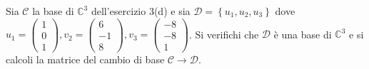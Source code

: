 \documentclass[a4paper]{article}
\begin{document}
	Sia $\mathscr{C}$ la base di $\mathbb{C}^{3}$ dell'esercizio 3(d) e sia $\mathscr{D} = \left\{u_{1}, u_{2}, u_{3}\right\}$ dove $u_{1} = \begin{pmatrix}
		1 \\ 0 \\ 1
	\end{pmatrix}, v_{2} = \begin{pmatrix}
		6 \\ -1 \\ 8
	\end{pmatrix}, v_{3} = \begin{pmatrix}
		-8 \\ -8 \\ 1
	\end{pmatrix}$. Si verifichi che $\mathscr{D}$ è una base di $\mathbb{C}^{3}$ e si calcoli la matrice del cambio di base $\mathscr{C} \rightarrow \mathscr{D}$.
\end{document}
